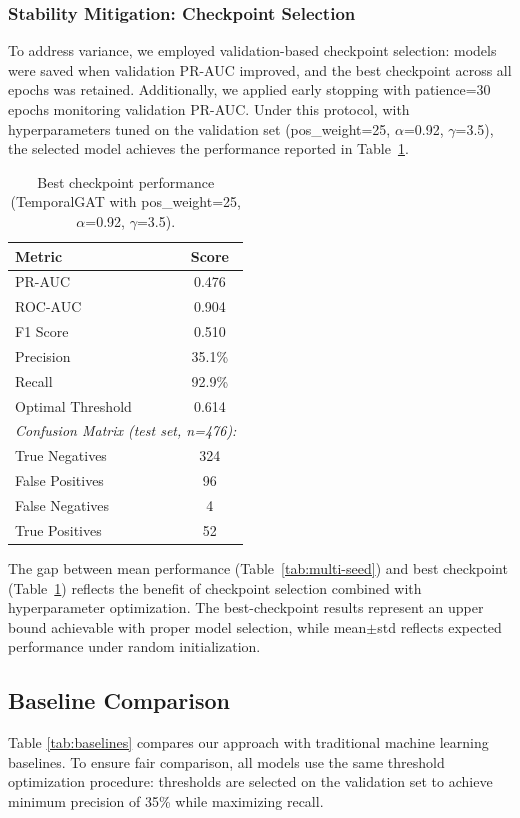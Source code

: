 \documentclass[12pt,a4paper]{article}
\begin{document}
\subsubsection{Stability Mitigation: Checkpoint Selection}
To address variance, we employed validation-based checkpoint selection: models were saved when validation PR-AUC improved, and the best checkpoint across all epochs was retained. Additionally, we applied early stopping with patience=30 epochs monitoring validation PR-AUC. Under this protocol, with hyperparameters tuned on the validation set (pos\_weight=25, $\alpha$=0.92, $\gamma$=3.5), the selected model achieves the performance reported in Table~\ref{tab:main-results}.

\begin{table}[H]
\centering
\caption{Best checkpoint performance (TemporalGAT with pos\_weight=25, $\alpha$=0.92, $\gamma$=3.5).}
\label{tab:main-results}
\begin{tabular}{lc}
\toprule
\textbf{Metric} & \textbf{Score} \\
\midrule
PR-AUC & 0.476 \\
ROC-AUC & 0.904 \\
F1 Score & 0.510 \\
Precision & 35.1\% \\
Recall & 92.9\% \\
Optimal Threshold & 0.614 \\
\midrule
\multicolumn{2}{l}{\textit{Confusion Matrix (test set, n=476):}} \\
True Negatives & 324 \\
False Positives & 96 \\
False Negatives & 4 \\
True Positives & 52 \\
\bottomrule
\end{tabular}
\end{table}

The gap between mean performance (Table~\ref{tab:multi-seed}) and best checkpoint (Table~\ref{tab:main-results}) reflects the benefit of checkpoint selection combined with hyperparameter optimization. The best-checkpoint results represent an upper bound achievable with proper model selection, while mean$\pm$std reflects expected performance under random initialization.

\subsection{Baseline Comparison}
Table \ref{tab:baselines} compares our approach with traditional machine learning baselines. To ensure fair comparison, all models use the same threshold optimization procedure: thresholds are selected on the validation set to achieve minimum precision of 35\% while maximizing recall.
\end{document}
